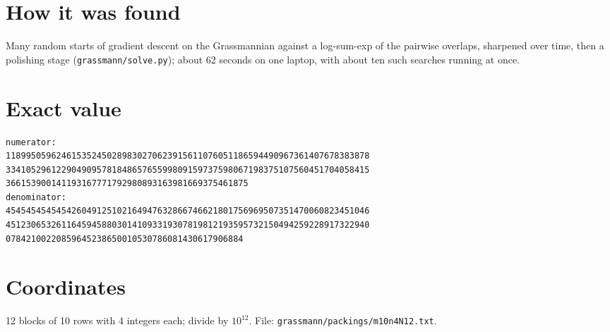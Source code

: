 \documentclass[11pt,a4paper]{article}
\begin{document}
\section{How it was found}
Many random starts of gradient descent on the Grassmannian against a log-sum-exp of the pairwise overlaps, sharpened over time, then a polishing stage (\texttt{grassmann/solve.py}); about 62 seconds on one laptop, with about ten such searches running at once.


\appendix
\section{Exact value}
{\small
\begin{verbatim}
numerator:
118995059624615352450289830270623915611076051186594490967361407678383878
334105296122904909578184865765599809159737598067198375107560451704058415
366153900141193167771792980893163981669375461875
denominator:
454545454545426049125102164947632866746621801756969507351470060823451046
451230653261164594588030141093319307819812193595732150494259228917322940
07842100220859645238650010530786081430617906884
\end{verbatim}}

\section{Coordinates}
12 blocks of 10 rows with 4 integers each; divide by $10^{12}$. File: \texttt{grassmann/packings/m10n4N12.txt}.
{\tiny
\begin{multicols}{3}
\end{multicols}}
\end{document}
